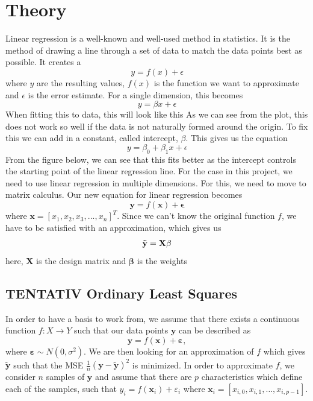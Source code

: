 \documentclass{article}
\begin{document}
\section{Theory}
Linear regression is a well-known and well-used method in statistics. It is the method of drawing a line through a set of data to match the data points best as possible. It creates a
\begin{equation*}
    y = f(x) + \epsilon
\end{equation*}
where $y$ are the resulting values, $f(x)$ is the function we want to approximate and $\epsilon$ is the error estimate. For a single dimension, this becomes
\begin{equation*}
    y = \beta x + \epsilon
\end{equation*}
When fitting this to data, this will look like this
As we can see from the plot, this does not work so well if the data is not naturally formed around the origin. To fix this we can add in a constant, called intercept, $\beta$. This gives us the equation
\begin{equation*}
    y = \beta_0 + \beta_1x + \epsilon
\end{equation*}
From the figure below, we can see that this fits better as the intercept controls the starting point of the linear regression line.
For the case in this project, we need to use linear regression in multiple dimensions. For this, we need to move to matrix calculus. Our new equation for linear regression becomes
\begin{equation*}
    \mathbf{y} = f(\mathbf{x}) + \mathbf{\epsilon}
\end{equation*}
where $\mathbf{x} = [x_1, x_2, x_3, ..., x_n]^T$. Since we can't know the original function $f$, we have to be satisfied with an approximation, which gives us
\begin{equation*}
    \mathbf{\Tilde{y}} = \mathbf{X\beta}
\end{equation*}
here, $\mathbf{X}$ is the design matrix and $\mathbf{\beta}$ is the weights

\newpage
\subsection{TENTATIV Ordinary Least Squares}
In order to have a basis to work from, we assume that there exists a continuous function $f: X \to Y$ such that our data points $\boldsymbol{y}$ can be described as
\begin{equation*}
    \boldsymbol{y} = f(\boldsymbol{x}) + \boldsymbol{\varepsilon},
\end{equation*}
where $\boldsymbol{\varepsilon} \sim N(0, \sigma^2)$. We are then looking for an approximation of $f$ which gives $\tilde{\boldsymbol{y}}$ such that the MSE $\frac{1}{n} \left( \boldsymbol{y} - \tilde{\boldsymbol{y}} \right)^2$ is minimized. In order to approximate $f$, we consider $n$ samples of $\boldsymbol{y}$ and assume that there are $p$ characteristics which define each of the samples, such that $y_i = f(\boldsymbol{x}_i) + \varepsilon_i$ where $\boldsymbol{x}_i = \left[x_{i,0}, x_{i, 1}, \ldots, x_{i, p-1} \right]$.
\end{document}
